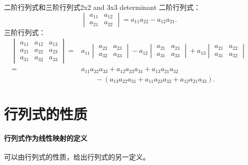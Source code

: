 \begin{example}
	{二阶行列式和三阶行列式}{2x2 and 3x3 determinant}
	二阶行列式：
	\begin{equation}
			\begin{vmatrix}
				a_{11}&a_{12}\\a_{21}&a_{22}
			\end{vmatrix}=a_{11}a_{22}-a_{12}a_{21}.
	\end{equation}
	三阶行列式：
	\begin{equation}
		\begin{aligned}
			\begin{vmatrix}
				a_{11}&a_{12}&a_{13}\\
				a_{21}&a_{22}&a_{23}\\
				a_{31}&a_{32}&a_{33}
			\end{vmatrix}={}&a_{11}
			\begin{vmatrix}
				a_{22}&a_{23}\\
				a_{32}&a_{33}
			\end{vmatrix}-a_{12}
			\begin{vmatrix}
				a_{21}&a_{23}\\
				a_{31}&a_{33}
			\end{vmatrix}+a_{13}
			\begin{vmatrix}
				a_{21}&a_{22}\\
				a_{31}&a_{32}
			\end{vmatrix}\\
			={}&a_{11}a_{22}a_{33}+a_{12}a_{23}a_{31}+a_{13}a_{21}a_{32}\\
			&\qquad-(a_{13}a_{22}a_{31}+a_{11}a_{23}a_{32}+a_{12}a_{21}a_{33}).
		\end{aligned}
	\end{equation}
\end{example}

\section{行列式的性质}

\paragraph{行列式作为线性映射的定义}

可以由行列式的性质，给出行列式的另一定义。

